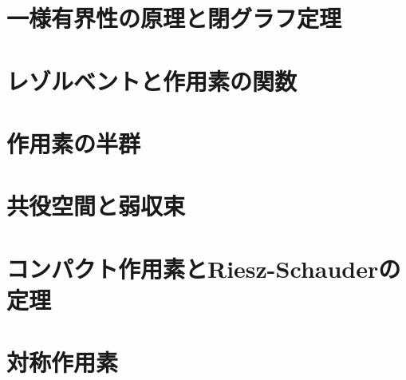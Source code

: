 \documentclass[uplatex, dvipdfmx]{jsreport}
\begin{document}
\chapter{一様有界性の原理と閉グラフ定理}

\chapter{レゾルベントと作用素の関数}

\chapter{作用素の半群}

\chapter{共役空間と弱収束}

\chapter{コンパクト作用素とRiesz-Schauderの定理}

\chapter{対称作用素}
\end{document}
